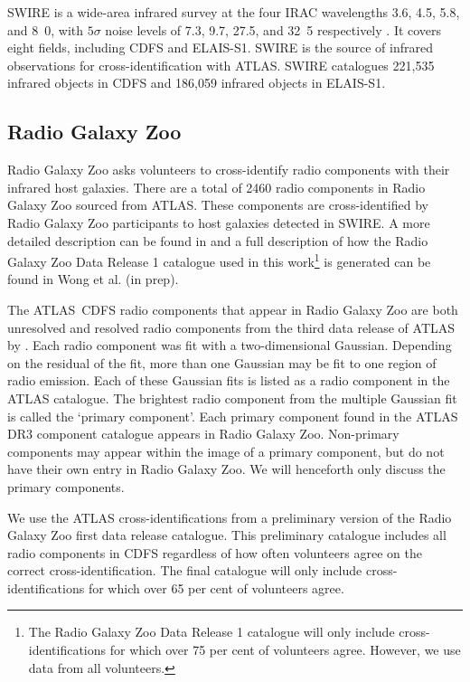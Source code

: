 \documentclass[fleqn,usenatbib,usedcolumn]{mnras}
\newcommand{\jansky}{\text{Jy}}
\begin{document}
    SWIRE \citep{lonsdale03swire, surace05swire} is a wide-area infrared
    survey at the four IRAC wavelengths 3.6, 4.5, 5.8, and
    \unit{8.0}{\micro\meter}, with $5\sigma$ noise levels of 7.3,
    9.7, 27.5, and \unit{32.5}{\micro\jansky} respectively
    \citep{lonsdale03swire}. It covers eight fields, including CDFS and ELAIS-S1. SWIRE is the source of infrared
    observations for cross-identification with ATLAS. SWIRE catalogues 221,535
    infrared objects in CDFS and 186,059 infrared objects in ELAIS-S1.

  \subsection{Radio Galaxy Zoo}\label{sec:rgz}

    Radio Galaxy Zoo asks volunteers to cross-identify radio components with
    their infrared host galaxies. There are a total of 2460 radio
    components in Radio Galaxy Zoo sourced from ATLAS. These
    components are cross-identified by Radio Galaxy Zoo participants to host galaxies detected in SWIRE. 
    A more detailed description can be found in
    \citet{banfield15} and a full description of how the Radio Galaxy Zoo Data Release 1 catalogue used in this work\footnote{The Radio Galaxy Zoo Data Release 1 catalogue will only
    include cross-identifications for which over 75 per cent of volunteers
    agree. However, we use data from all volunteers.} 
    is generated can be found in Wong et al. (in prep).

     The ATLAS~CDFS radio components that appear in Radio Galaxy Zoo are both unresolved and resolved radio components from the third data release of ATLAS by \citet{franzen15}.  Each radio component was fit with a two-dimensional
    Gaussian. Depending on the residual of the fit, more than one Gaussian may
    be fit to one region of radio emission.  Each of these Gaussian fits is
    listed as a radio component in the ATLAS catalogue. The brightest radio
    component from the multiple Gaussian fit is called the `primary
    component'. Each primary component found in the ATLAS DR3 component
    catalogue appears in Radio Galaxy Zoo. Non-primary components may appear
    within the image of a primary component, but do not have their own entry
    in Radio Galaxy Zoo. We will henceforth only discuss the primary
    components.

    We use the ATLAS cross-identifications from a preliminary version of the
    Radio Galaxy Zoo first data release catalogue. This preliminary catalogue
    includes all radio components in CDFS regardless of how often volunteers
    agree on the correct cross-identification. The final catalogue will only
    include cross-identifications for which over 65 per cent of volunteers
    agree.
\end{document}

